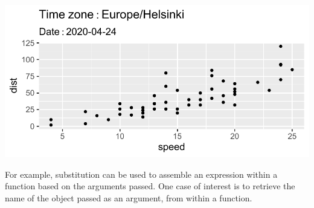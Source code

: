 \documentclass[krantz2]{krantz}\usepackage{knitr}
\begin{document}
\begin{knitrout}\footnotesize
{}\color{fgcolor}\begin{kframe}
\begin{alltt}
  \hlopt{+}
  \hlstd{()} \hlopt{+}
  \hlstd{(} \hlstd{=} \hlopt{~}\hlopt{:}  \hlstd{(} \hlstd{=} \hlstd{())),}
        \hlstd{=} \hlopt{:}  \hlstd{(} \hlstd{=} \hlstd{(}\hlstd{())))}
       \hlstd{)}
\end{alltt}
\end{kframe}

{\centering \includegraphics[width=.7\textwidth]{figure/pos-expr-substitute-01-1}

}



\end{knitrout}

For example, substitution can be used to assemble an expression within a function based on the arguments passed. One case of interest is to retrieve the name of the object passed as an argument, from within a function.
\end{document}
